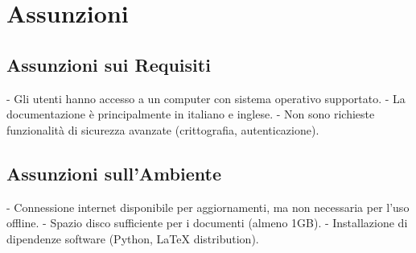 \section{Assunzioni}

\subsection{Assunzioni sui Requisiti}

- Gli utenti hanno accesso a un computer con sistema operativo supportato.
- La documentazione è principalmente in italiano e inglese.
- Non sono richieste funzionalità di sicurezza avanzate (crittografia, autenticazione).

\subsection{Assunzioni sull'Ambiente}

- Connessione internet disponibile per aggiornamenti, ma non necessaria per l'uso offline.
- Spazio disco sufficiente per i documenti (almeno 1GB).
- Installazione di dipendenze software (Python, LaTeX distribution).